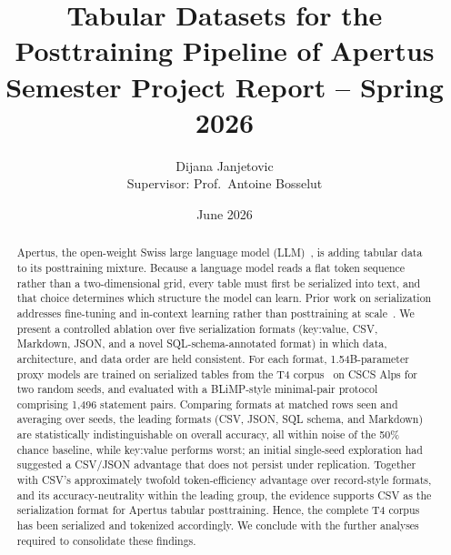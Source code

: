 \documentclass[11pt,a4paper]{article}
\title{\textbf{Tabular Datasets for the Posttraining Pipeline of Apertus}\\[1ex]
\large Semester Project Report -- Spring 2026}
\author{Dijana Janjetovic\\[0.5ex]
\small Supervisor: Prof.\ Antoine Bosselut}
\date{June 2026}
\begin{document}
\maketitle
\begin{abstract}
\noindent
Apertus, the open-weight Swiss large language model (LLM)~\cite{apertus}, is adding tabular data to its posttraining mixture. Because a language model reads a flat token sequence rather than a two-dimensional grid, every table must first be serialized into text, and that choice determines which structure the model can learn. Prior work on serialization addresses fine-tuning and in-context learning rather than posttraining at scale~\cite{tabllm,jaitly,wang,wu2025}. We present a controlled ablation over five serialization formats (key:value, CSV, Markdown, JSON, and a novel SQL-schema-annotated format) in which data, architecture, and data order are held consistent. For each format, 1.54B-parameter proxy models are trained on serialized tables from the T4 corpus~\cite{t4} on CSCS Alps for two random seeds, and evaluated with a BLiMP-style minimal-pair protocol~\cite{blimp} comprising 1{,}496 statement pairs. Comparing formats at matched rows seen and averaging over seeds, the leading formats (CSV, JSON, SQL schema, and Markdown) are statistically indistinguishable on overall accuracy, all within noise of the 50\% chance baseline, while key:value performs worst; an initial single-seed exploration had suggested a CSV/JSON advantage that does not persist under replication. Together with CSV's approximately twofold token-efficiency advantage over record-style formats, and its accuracy-neutrality within the leading group, the evidence supports CSV as the serialization format for Apertus tabular posttraining. Hence, the complete T4 corpus has been serialized and tokenized accordingly. We conclude with the further analyses required to consolidate these findings.
\end{abstract}
\end{document}
